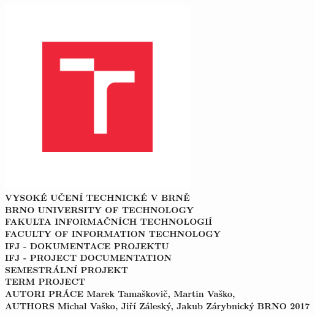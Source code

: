 \documentclass[12pt,a4paper]{report}
\begin{document}
\begin{titlepage}

\selectfont
\addtolength{\voffset}{-3cm}

\noindent\hspace{-60.0pt}\includegraphics[width=0.6\textwidth]{./img/VUT_symbol_barevne_CMYK_CZ}\\
\Large\textbf{VYSOKÉ UČENÍ TECHNICKÉ V BRNĚ}\\
\small\textbf{BRNO UNIVERSITY OF TECHNOLOGY}\\\vfill\hspace{-0.7cm}
\Large\textbf{FAKULTA INFORMAČNÍCH TECHNOLOGIÍ}\\
\small\textbf{FACULTY OF INFORMATION TECHNOLOGY}\\\vfill\hspace{-0.7cm}
\Large\textbf{IFJ - DOKUMENTACE PROJEKTU}\\
\small\textbf{IFJ - PROJECT DOCUMENTATION}\\\vfill\hspace{-0.7cm}
\Large\textbf{SEMESTRÁLNÍ PROJEKT}\\
\small\textbf{TERM PROJECT}\\\vfill\hspace{-0.7cm}
\Large\textbf{AUTORI PRÁCE \hfill \normalsize{Marek Tamaškovič, Martin Vaško,}}\\
\small\textbf{AUTHORS} \hfill \normalsize\textbf{Michal Vaško, Jiří Záleský, Jakub Zárybnický}
\vfill\hspace{-0.7cm}
\large\textbf{BRNO 2017}

\newpage
\fontfamily{\familydefault}\selectfont%
\end{titlepage}

\end{document}
